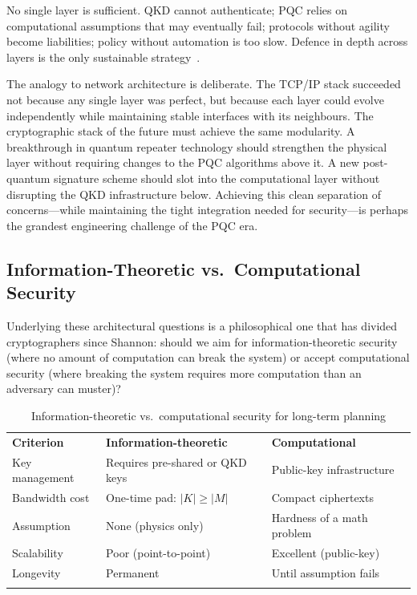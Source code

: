 No single layer is sufficient.  QKD cannot authenticate; PQC relies on computational assumptions that may eventually fail; protocols without agility become liabilities; policy without automation is too slow.  Defence in depth across layers is the only sustainable strategy~\cite{Peikert2016}.

The analogy to network architecture is deliberate.  The TCP/IP stack succeeded not because any single layer was perfect, but because each layer could evolve independently while maintaining stable interfaces with its neighbours.  The cryptographic stack of the future must achieve the same modularity.  A breakthrough in quantum repeater technology should strengthen the physical layer without requiring changes to the PQC algorithms above it.  A new post-quantum signature scheme should slot into the computational layer without disrupting the QKD infrastructure below.  Achieving this clean separation of concerns---while maintaining the tight integration needed for security---is perhaps the grandest engineering challenge of the PQC era.

\subsection{Information-Theoretic vs.\ Computational Security}
\label{subsec:it-vs-comp}

Underlying these architectural questions is a philosophical one that has divided cryptographers since Shannon: should we aim for information-theoretic security (where no amount of computation can break the system) or accept computational security (where breaking the system requires more computation than an adversary can muster)?

\begin{table}[t]
\caption{Information-theoretic vs.\ computational security for long-term planning}
\label{tab:it-vs-comp}
\begin{tabular}{p{3cm}p{4.5cm}p{4.5cm}}
\hline\noalign{\smallskip}
\textbf{Criterion} & \textbf{Information-theoretic} & \textbf{Computational} \\
\noalign{\smallskip}\svhline\noalign{\smallskip}
Key management & Requires pre-shared or QKD keys & Public-key infrastructure \\
Bandwidth cost & One-time pad: $|K| \geq |M|$ & Compact ciphertexts \\
Assumption & None (physics only) & Hardness of a math problem \\
Scalability & Poor (point-to-point) & Excellent (public-key) \\
Longevity & Permanent & Until assumption fails \\
\noalign{\smallskip}\hline
\end{tabular}
\end{table}


